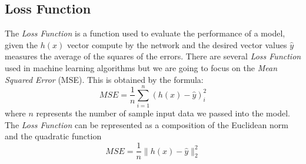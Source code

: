 \subsection{Loss Function}
\label{Loss:Mse}
The \textit{Loss Function} is a function used to evaluate the performance of a model, given the $h(x)$ vector compute by the network and the desired vector values $\widehat{y}$ measures the average of the squares of the errors. There are several \textit{Loss Function} used in machine learning algorithms but we are going to focus on the \textit{Mean Squared Error} (MSE). This is obtained by the formula: 	
\begin{equation}
MSE = \frac{1}{n} \sum_{i=1}^n (h(x) - \widehat{y})_{i}^2
\end{equation}
where $n$ represents the number of sample input data we passed into the model. 
The \textit{Loss Function} can be represented as a composition of the Euclidean norm and the quadratic function
\begin{equation}
MSE = \frac{1}{n} \parallel h(x) - \widehat{y} \parallel_{2}^2  
\end{equation}

